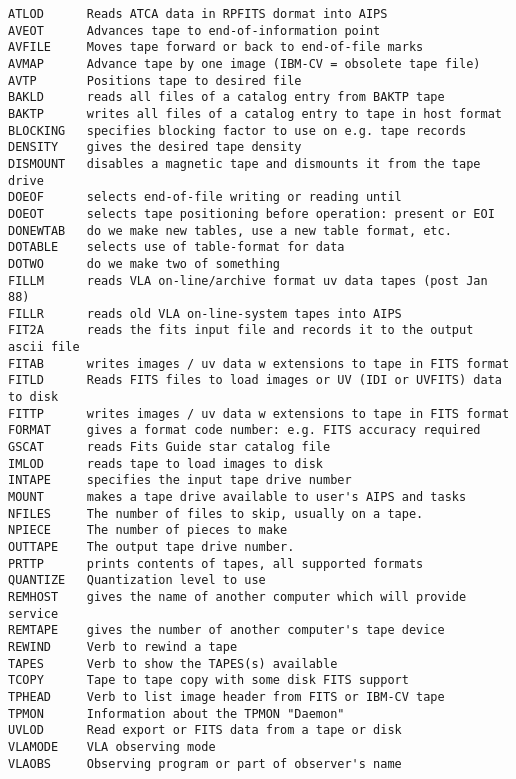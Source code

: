 \vskip 0.5pt
\bbve\begin{verbatim}
ATLOD      Reads ATCA data in RPFITS dormat into AIPS
AVEOT      Advances tape to end-of-information point
AVFILE     Moves tape forward or back to end-of-file marks
AVMAP      Advance tape by one image (IBM-CV = obsolete tape file)
AVTP       Positions tape to desired file
BAKLD      reads all files of a catalog entry from BAKTP tape
BAKTP      writes all files of a catalog entry to tape in host format
BLOCKING   specifies blocking factor to use on e.g. tape records
DENSITY    gives the desired tape density
DISMOUNT   disables a magnetic tape and dismounts it from the tape drive
DOEOF      selects end-of-file writing or reading until
DOEOT      selects tape positioning before operation: present or EOI
DONEWTAB   do we make new tables, use a new table format, etc.
DOTABLE    selects use of table-format for data
DOTWO      do we make two of something
FILLM      reads VLA on-line/archive format uv data tapes (post Jan 88)
FILLR      reads old VLA on-line-system tapes into AIPS
FIT2A      reads the fits input file and records it to the output ascii file
FITAB      writes images / uv data w extensions to tape in FITS format
FITLD      Reads FITS files to load images or UV (IDI or UVFITS) data to disk
FITTP      writes images / uv data w extensions to tape in FITS format
FORMAT     gives a format code number: e.g. FITS accuracy required
GSCAT      reads Fits Guide star catalog file
IMLOD      reads tape to load images to disk
INTAPE     specifies the input tape drive number
MOUNT      makes a tape drive available to user's AIPS and tasks
NFILES     The number of files to skip, usually on a tape.
NPIECE     The number of pieces to make
OUTTAPE    The output tape drive number.
PRTTP      prints contents of tapes, all supported formats
QUANTIZE   Quantization level to use
REMHOST    gives the name of another computer which will provide service
REMTAPE    gives the number of another computer's tape device
REWIND     Verb to rewind a tape
TAPES      Verb to show the TAPES(s) available
TCOPY      Tape to tape copy with some disk FITS support
TPHEAD     Verb to list image header from FITS or IBM-CV tape
TPMON      Information about the TPMON "Daemon"
UVLOD      Read export or FITS data from a tape or disk
VLAMODE    VLA observing mode
VLAOBS     Observing program or part of observer's name
\end{verbatim}\eve


